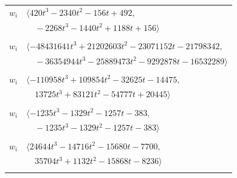 \documentclass[11pt]{article}
\begin{document}
\begin{longtable}{@{}ll@{}}
$w_i$ & $\langle 420t^{3}-2340t^{2}-156t+492,$\\
 & $\quad -2268t^{3}-1440t^{2}+1188t+156\rangle$\\
\addlinespace[2pt]
\multicolumn{2}{@{}p{0.97\textwidth}@{}}{$i=59$, $D_i=2097152$, $\rho_{ij}$: $0{:}1, \allowbreak 2{:}2, \allowbreak 6{:}2, \allowbreak 7{:}1, \allowbreak 8{:}2, \allowbreak 13{:}1, \allowbreak 22{:}2, \allowbreak 23{:}2, \allowbreak 26{:}2, \allowbreak 31{:}2, \allowbreak 39{:}2, \allowbreak 41{:}1, \allowbreak 50{:}2, \allowbreak 64{:}1, \allowbreak 66{:}2, \allowbreak 71{:}2$}\\
$w_i$ & $\langle -48431641t^{3}+21202603t^{2}-23071152t-21798342,$\\
 & $\quad -36354944t^{3}-25889473t^{2}-9292878t-16532289\rangle$\\
\addlinespace[2pt]
\multicolumn{2}{@{}p{0.97\textwidth}@{}}{$i=60$, $D_i=4096$, $\rho_{ij}$: $0{:}2, \allowbreak 1{:}2, \allowbreak 5{:}1, \allowbreak 22{:}2, \allowbreak 28{:}2, \allowbreak 39{:}2, \allowbreak 40{:}1, \allowbreak 48{:}1, \allowbreak 61{:}2, \allowbreak 63{:}2, \allowbreak 64{:}1, \allowbreak 65{:}2$}\\
$w_i$ & $\langle -110958t^{3}+109854t^{2}-32625t-14475,$\\
 & $\quad 13725t^{3}+83121t^{2}-54777t+20445\rangle$\\
\addlinespace[2pt]
\multicolumn{2}{@{}p{0.97\textwidth}@{}}{$i=61$, $D_i=128$, $\rho_{ij}$: $0{:}2, \allowbreak 1{:}1, \allowbreak 8{:}2, \allowbreak 10{:}1, \allowbreak 21{:}1, \allowbreak 45{:}1, \allowbreak 54{:}2, \allowbreak 60{:}1, \allowbreak 63{:}1, \allowbreak 64{:}1$}\\
$w_i$ & $\langle -1235t^{3}-1329t^{2}-1257t-383,$\\
 & $\quad -1235t^{3}-1329t^{2}-1257t-383\rangle$\\
\addlinespace[2pt]
\multicolumn{2}{@{}p{0.97\textwidth}@{}}{$i=62$, $D_i=1024$, $\rho_{ij}$: $0{:}1, \allowbreak 2{:}2, \allowbreak 4{:}1, \allowbreak 9{:}1, \allowbreak 14{:}2, \allowbreak 30{:}1, \allowbreak 35{:}1, \allowbreak 42{:}1, \allowbreak 43{:}2, \allowbreak 67{:}2, \allowbreak 70{:}1$}\\
$w_i$ & $\langle 24644t^{3}-14716t^{2}-15680t-7700,$\\
 & $\quad 35704t^{3}+1132t^{2}-15868t-8236\rangle$\\
\addlinespace[2pt]
\multicolumn{2}{@{}p{0.97\textwidth}@{}}{$i=63$, $D_i=4096$, $\rho_{ij}$: $0{:}2, \allowbreak 21{:}2, \allowbreak 30{:}2, \allowbreak 31{:}1, \allowbreak 42{:}1, \allowbreak 49{:}1, \allowbreak 60{:}1, \allowbreak 61{:}2, \allowbreak 67{:}1, \allowbreak 71{:}1$}\\

\end{longtable}
\end{document}
